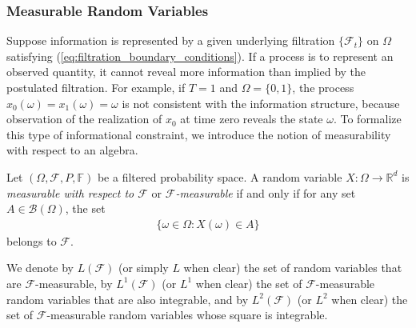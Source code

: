 \documentclass[\topdir/lecture\_notes.tex]{subfiles}
\begin{document}



\subsubsection*{Measurable Random Variables}
Suppose information is represented by a given underlying filtration \(\{\mathcal{F}_{t}\}\) on \(\Omega\) satisfying (\ref{eq:filtration_boundary_conditions}). If a process is to represent an observed quantity, it cannot reveal more information than implied by the postulated filtration. For example, if \(T=1\) and \(\Omega=\{0,1\}\), the process \(x_{0}(\omega)=x_{1}(\omega)=\omega\) is not consistent with the information structure, because observation of the realization of \(x_{0}\) at time zero reveals the state \(\omega\). To formalize this type of informational constraint, we introduce the notion of measurability with respect to an algebra.

\begin{defn}
Let \((\Omega, \mathcal{F}, P, \mathbb{F})\) be a filtered probability space. A random variable \(X: \Omega \rightarrow \mathbb{R}^{d}\) is \emph{measurable with respect to \(\mathcal{F}\)} or \emph{\(\mathcal{F}\)-measurable} if and only if for any set \(A\in \mathcal{B}(\Omega)\), the set
\begin{align*}
\{\omega \in \Omega: X(\omega) \in A\}
\end{align*}
belongs to \(\mathcal{F}\).
\end{defn}

We denote by \(L(\mathcal{F})\) (or simply \(L\) when clear) the set of random variables that are \(\mathcal{F}\)-measurable, by \(L^{1}(\mathcal{F})\) (or \(L^{1}\) when clear) the set of \(\mathcal{F}\)-measurable random variables that are also integrable, and by \(L^{2}(\mathcal{F})\) (or \(L^{2}\) when clear) the set of \(\mathcal{F}\)-measurable random variables whose square is integrable.
\end{document}
